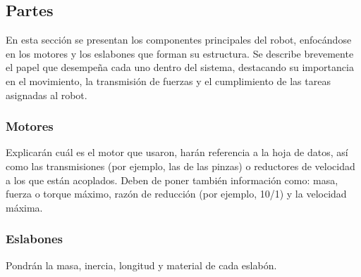 \subsection{Partes} \label{subsec:partes}
En esta sección se presentan los componentes principales del robot, enfocándose en los motores y los eslabones que forman su estructura. Se describe brevemente el papel que desempeña cada uno dentro del sistema, destacando su importancia en el movimiento, la transmisión de fuerzas y el cumplimiento de las tareas asignadas al robot.


\subsubsection{Motores} \label{subsubsec:motores}
Explicarán cuál es el motor que usaron, harán referencia a la hoja de datos, así como las transmisiones (por ejemplo, las de las pinzas) o reductores de velocidad a los que están acoplados. Deben de poner también información como: masa, fuerza o torque máximo, razón de reducción (por ejemplo, 10/1) y la velocidad máxima.
\subsubsection{Eslabones} \label{subsubsec:eslabones}
Pondrán la masa, inercia, longitud y material de cada eslabón.